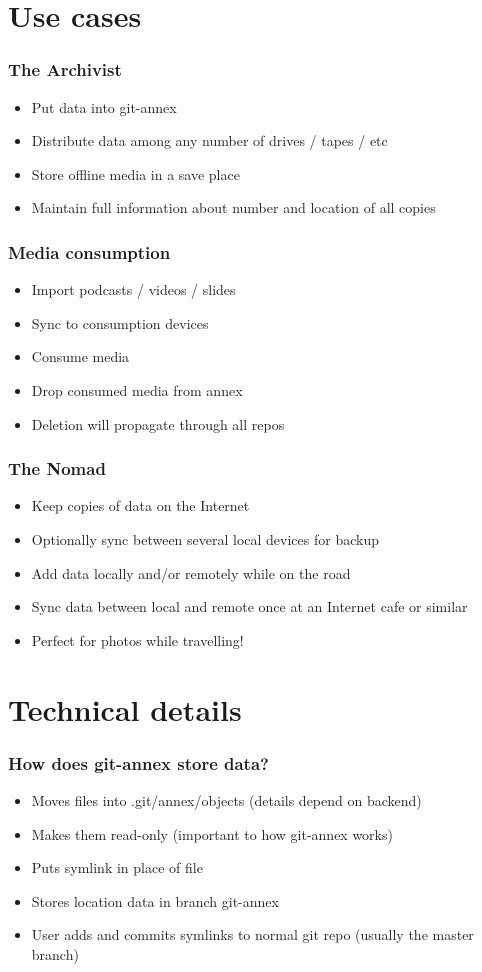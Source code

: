\documentclass[t]{beamer}
\begin{document}
\section{Use cases}

\begin{frame}
	\frametitle{The Archivist}
	\begin{itemize}
		\item Put data into git-annex
		\item Distribute data among any number of drives / tapes / etc
		\item Store offline media in a save place
		\item Maintain full information about number and location of all copies
	\end{itemize}
\end{frame}

\begin{frame}
	\frametitle{Media consumption}
	\begin{itemize}
		\item Import podcasts / videos / slides
		\item Sync to consumption devices
		\item Consume media
		\item Drop consumed media from annex
		\item Deletion will propagate through all repos
	\end{itemize}
\end{frame}

\begin{frame}
	\frametitle{The Nomad}
	\begin{itemize}
		\item Keep copies of data on the Internet
		\item Optionally sync between several local devices for backup
		\item Add data locally and/or remotely while on the road
		\item Sync data between local and remote once at an Internet cafe or similar
		\item Perfect for photos while travelling!
	\end{itemize}
\end{frame}


\section{Technical details}

\begin{frame}
	\frametitle{How does git-annex store data?}
	\begin{itemize}
		\item Moves files into .git/annex/objects (details depend on backend)
		\item Makes them read-only (important to how git-annex works)
		\item Puts symlink in place of file
		\item Stores location data in branch git-annex
		\item User adds and commits symlinks to normal git repo (usually the master branch)
	\end{itemize}
\end{frame}
\end{document}
